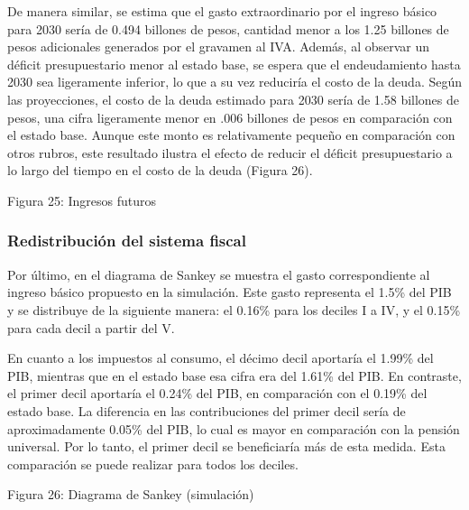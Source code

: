 De manera similar, se estima que el gasto extraordinario por el ingreso
básico para 2030 sería de 0.494 billones de pesos, cantidad menor a los
1.25 billones de pesos adicionales generados por el gravamen al IVA.
Además, al observar un déficit presupuestario menor al estado base, se
espera que el endeudamiento hasta 2030 sea ligeramente inferior, lo que
a su vez reduciría el costo de la deuda. Según las proyecciones, el
costo de la deuda estimado para 2030 sería de 1.58 billones de pesos,
una cifra ligeramente menor en .006 billones de pesos en comparación con
el estado base. Aunque este monto es relativamente pequeño en
comparación con otros rubros, este resultado ilustra el efecto de
reducir el déficit presupuestario a lo largo del tiempo en el costo de
la deuda (Figura 26).

Figura 25: Ingresos futuros



\hypertarget{redistribuciuxf3n-del-sistema-fiscal}{%
\subsubsection{Redistribución del sistema
fiscal}\label{redistribuciuxf3n-del-sistema-fiscal}}

Por último, en el diagrama de Sankey se muestra el gasto correspondiente
al ingreso básico propuesto en la simulación. Este gasto representa el
1.5\% del PIB y se distribuye de la siguiente manera: el 0.16\% para los
deciles I a IV, y el 0.15\% para cada decil a partir del V.

En cuanto a los impuestos al consumo, el décimo decil aportaría el
1.99\% del PIB, mientras que en el estado base esa cifra era del 1.61\%
del PIB. En contraste, el primer decil aportaría el 0.24\% del PIB, en
comparación con el 0.19\% del estado base. La diferencia en las
contribuciones del primer decil sería de aproximadamente 0.05\% del PIB,
lo cual es mayor en comparación con la pensión universal. Por lo tanto,
el primer decil se beneficiaría más de esta medida. Esta comparación se
puede realizar para todos los deciles.

Figura 26: Diagrama de Sankey (simulación)



